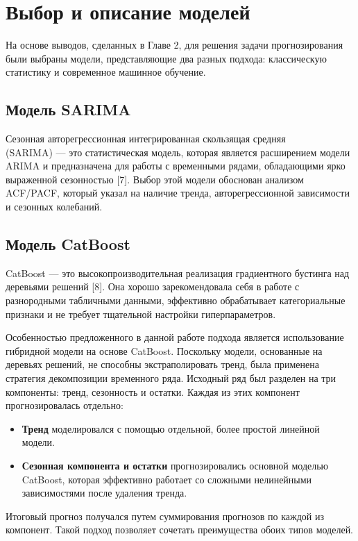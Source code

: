 \section{Выбор и описание моделей}
\label{sec:model_selection}

На основе выводов, сделанных в Главе 2, для решения задачи прогнозирования были выбраны модели, представляющие два разных подхода: классическую статистику и современное машинное обучение.

\subsection{Модель SARIMA}
Сезонная авторегрессионная интегрированная скользящая средняя \\(SARIMA) — это статистическая модель, которая является расширением модели ARIMA и предназначена для работы с временными рядами, обладающими ярко выраженной сезонностью [7]. Выбор этой модели обоснован анализом ACF/PACF, который указал на наличие тренда, авторегрессионной зависимости и сезонных колебаний.

\subsection{Модель CatBoost}
CatBoost — это высокопроизводительная реализация градиентного бустинга над деревьями решений [8]. Она хорошо зарекомендовала себя в работе с разнородными табличными данными, эффективно обрабатывает категориальные признаки и не требует тщательной настройки гиперпараметров.

Особенностью предложенного в данной работе подхода является использование гибридной модели на основе CatBoost. Поскольку модели, основанные на деревьях решений, не способны экстраполировать тренд, была применена стратегия декомпозиции временного ряда. Исходный ряд был разделен на три компоненты: тренд, сезонность и остатки. Каждая из этих компонент прогнозировалась отдельно:
\begin{itemize}
    \item \textbf{Тренд} моделировался с помощью отдельной, более простой линейной модели.
    \item \textbf{Сезонная компонента и остатки} прогнозировались основной моделью CatBoost, которая эффективно работает со сложными нелинейными зависимостями после удаления тренда.
\end{itemize}
Итоговый прогноз получался путем суммирования прогнозов по каждой из компонент. Такой подход позволяет сочетать преимущества обоих типов моделей.

